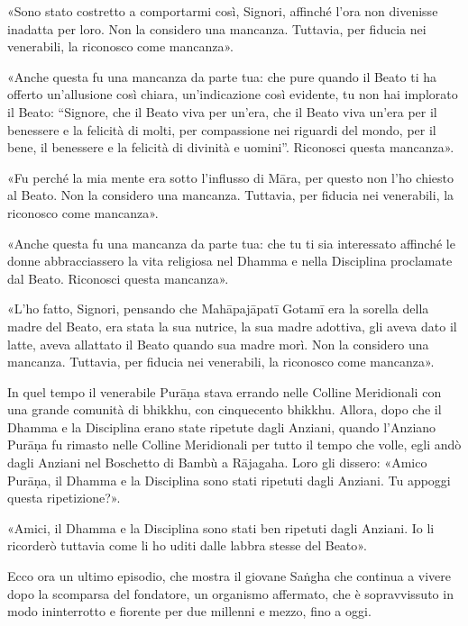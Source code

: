 «Sono stato costretto a comportarmi così, Signori, affinché l’ora non divenisse
inadatta per loro. Non la considero una mancanza. Tuttavia, per fiducia nei
venerabili, la riconosco come mancanza».

«Anche questa fu una mancanza da parte tua: che pure quando il Beato ti ha
offerto un’allusione così chiara, un’indicazione così evidente, tu non hai
implorato il Beato: “Signore, che il Beato viva per un’era, che il Beato viva
un’era per il benessere e la felicità di molti, per compassione nei riguardi del
mondo, per il bene, il benessere e la felicità di divinità e uomini”. Riconosci
questa mancanza».

«Fu perché la mia mente era sotto l’influsso di Māra, per questo non l’ho
chiesto al Beato. Non la considero una mancanza. Tuttavia, per fiducia nei
venerabili, la riconosco come mancanza».

«Anche questa fu una mancanza da parte tua: che tu ti sia interessato affinché
le donne abbracciassero la vita religiosa nel Dhamma e nella Disciplina
proclamate dal Beato. Riconosci questa mancanza».

«L’ho fatto, Signori, pensando che Mahāpajāpatī Gotamī era la sorella della
madre del Beato, era stata la sua nutrice, la sua madre adottiva, gli aveva dato
il latte, aveva allattato il Beato quando sua madre morì. Non la considero una
mancanza. Tuttavia, per fiducia nei venerabili, la riconosco come mancanza».


In quel tempo il venerabile Purāṇa stava errando nelle Colline Meridionali con
una grande comunità di bhikkhu, con cinquecento bhikkhu. Allora, dopo che il
Dhamma e la Disciplina erano state ripetute dagli Anziani, quando l’Anziano
Purāṇa fu rimasto nelle Colline Meridionali per tutto il tempo che volle, egli
andò dagli Anziani nel Boschetto di Bambù a Rājagaha. Loro gli dissero: «Amico
Purāṇa, il Dhamma e la Disciplina sono stati ripetuti dagli Anziani. Tu appoggi
questa ripetizione?».

«Amici, il Dhamma e la Disciplina sono stati ben ripetuti dagli Anziani. Io li
ricorderò tuttavia come li ho uditi dalle labbra stesse del Beato».


 Ecco ora un ultimo episodio, che mostra il giovane
Saṅgha che continua a vivere dopo la scomparsa del fondatore, un organismo
affermato, che è sopravvissuto in modo ininterrotto e fiorente per due millenni
e mezzo, fino a oggi.

